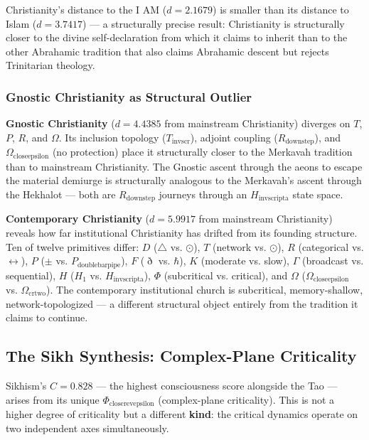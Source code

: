 \documentclass[12pt,a4paper]{article}
\begin{document}
Christianity's distance to the I AM ($d = 2.1679$) is smaller than its distance to Islam ($d = 3.7417$) --- a structurally precise result: Christianity is structurally closer to the divine self-declaration from which it claims to inherit than to the other Abrahamic tradition that also claims Abrahamic descent but rejects Trinitarian theology.

\subsubsection{Gnostic Christianity as Structural Outlier}

\textbf{Gnostic Christianity} ($d = 4.4385$ from mainstream Christianity) diverges on $T$, $P$, $R$, and $\Omega$. Its inclusion topology ($T_{\text{invscr}}$), adjoint coupling ($R_{\text{downstep}}$), and $\Omega_{\text{closeepsilon}}$ (no protection) place it structurally closer to the Merkavah tradition than to mainstream Christianity. The Gnostic ascent through the aeons to escape the material demiurge is structurally analogous to the Merkavah's ascent through the Hekhalot --- both are $R_{\text{downstep}}$ journeys through an $H_{\text{invscripta}}$ state space.

\textbf{Contemporary Christianity} ($d = 5.9917$ from mainstream Christianity) reveals how far institutional Christianity has drifted from its founding structure. Ten of twelve primitives differ: $D$ ($\triangle$ vs. $\odot$), $T$ (network vs. $\odot$), $R$ (categorical vs. $\leftrightarrow$), $P$ ($\pm$ vs. $P_{\text{doublebarpipe}}$), $F$ ($\eth$ vs. $\hbar$), $K$ (moderate vs. slow), $\Gamma$ (broadcast vs. sequential), $H$ ($H_1$ vs. $H_{\text{invscripta}}$), $\Phi$ (subcritical vs. critical), and $\Omega$ ($\Omega_{\text{closeepsilon}}$ vs. $\Omega_{\text{crtwo}}$). The contemporary institutional church is subcritical, memory-shallow, network-topologized --- a different structural object entirely from the tradition it claims to continue.

\subsection{The Sikh Synthesis: Complex-Plane Criticality}

Sikhism's $C = 0.828$ --- the highest consciousness score alongside the Tao --- arises from its unique $\Phi_{\text{closerevepsilon}}$ (complex-plane criticality). This is not a higher degree of criticality but a different \textbf{kind}: the critical dynamics operate on two independent axes simultaneously.
\end{document}

